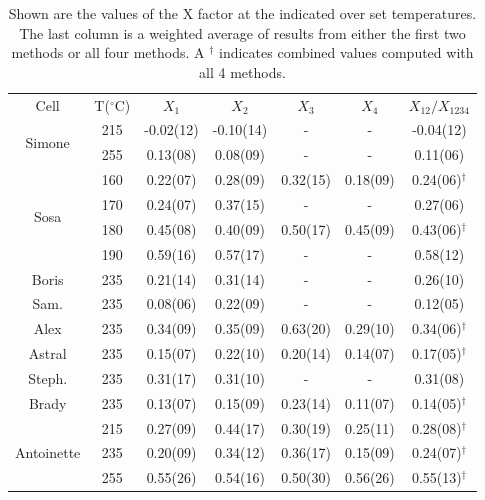 \begin{table}
	\scriptsize
	\captionsetup{font=small}
	\begin{center}
		\def\arraystretch{0.75}
		\setlength\tabcolsep{1pt}
		\begin{tabular}{|c|c|cccc|c|}
			\hline
			Cell & T($^\circ$C) & $X_1$ & $X_2$ & $X_3$ & $X_4$ & $X_{12}/X_{1234}$\\ 
			\multirow{2}{*}{Simone} & 215 & -0.02(12) & -0.10(14) & - & - & -0.04(12) \\
			& 255 & 0.13(08) & 0.08(09) & - & - & 0.11(06) \\
			\hline
			\multirow{4}{*}{Sosa} & 160 & 0.22(07) & 0.28(09) & 0.32(15) & 0.18(09) & 0.24(06)$^\dagger$ \\
			& 170 & 0.24(07) & 0.37(15) & - & - & 0.27(06)\\
			& 180 & 0.45(08) & 0.40(09) & 0.50(17) & 0.45(09) & 0.43(06)$^\dagger$ \\
			& 190 & 0.59(16) & 0.57(17) & - & - & 0.58(12) \\
			\hline
			\hline
			Boris & 235 & 0.21(14) & 0.31(14) & - & - & 0.26(10)\\
			\hline
			Sam. & 235 & 0.08(06) & 0.22(09) & - & - & 0.12(05) \\
			\hline
			Alex & 235 & 0.34(09) & 0.35(09) & 0.63(20) & 0.29(10) & 0.34(06)$^\dagger$\\
			\hline
			Astral & 235 & 0.15(07) & 0.22(10) & 0.20(14) & 0.14(07) & 0.17(05)$^\dagger$\\
			\hline
			Steph. & 235 & 0.31(17) & 0.31(10) & - & - & 0.31(08)\\
			\hline
			Brady & 235 & 0.13(07) & 0.15(09) & 0.23(14) & 0.11(07) & 0.14(05)$^\dagger$\\
			\hline
			\multirow{3}{*}{Antoinette} & 215 & 0.27(09) & 0.44(17) & 0.30(19) & 0.25(11) & 0.28(08)$^\dagger$\\
			& 235 & 0.20(09) & 0.34(12) & 0.36(17) & 0.15(09) & 0.24(07)$^\dagger$\\
			& 255 & 0.55(26) & 0.54(16) & 0.50(30) & 0.56(26) & 0.55(13)$^\dagger$\\
			\hline
		\end{tabular}
		\caption
		{Shown are the values of the X factor at the indicated over set temperatures. The last column is a weighted average of results from either the first two methods or all four methods. A $^\dagger$ indicates combined values computed with all 4 methods.}
		\label{Xtable}
	\end{center}
\end{table}

